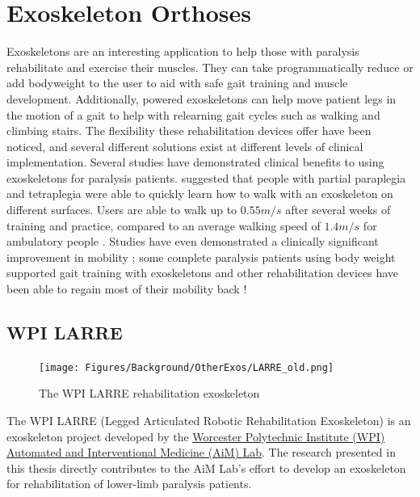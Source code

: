 \section{Exoskeleton Orthoses}
\label{sec:OtherExos}
Exoskeletons are an interesting application to help those with paralysis rehabilitate and exercise their muscles. They can take programmatically reduce or add bodyweight to the user to aid with safe gait training and muscle development. Additionally, powered exoskeletons can help move patient legs in the motion of a gait to help with relearning gait cycles such as walking and climbing stairs. The flexibility these rehabilitation devices offer have been noticed, and several different solutions exist at different levels of clinical implementation. Several studies have demonstrated clinical benefits to using exoskeletons for paralysis patients. \cite{ExoMobilityOutcome} suggested that people with partial paraplegia and tetraplegia were able to quickly learn how to walk with an exoskeleton on different surfaces. Users are able to walk up to \(0.55m/s\) after several weeks of training and practice, compared to an average walking speed of \(1.4m/s\) for ambulatory people \cite{IndigoClinicalStudy}. Studies have even demonstrated a clinically significant improvement in mobility \cite{GaitTrainingBenefitsRoboticsWalkbot} \cite{ImprovingGaitAdaptabilityInPatients} \cite{RoboticGaitTraining}; some complete paralysis patients using body weight supported gait training with exoskeletons and other rehabilitation devices have been able to regain most of their mobility back \cite{GaitTrainingClinical}!

\subsection{WPI LARRE}
\label{sec:larre}
\begin{figure}[ht!]
    \centering
    \texttt{[image: Figures/Background/OtherExos/LARRE\_old.png]}
    \caption{The WPI LARRE rehabilitation exoskeleton \cite{SpringWrapClutchKnee}}
    \label{fig:LARRE_Background}
\end{figure}

The WPI LARRE (Legged Articulated Robotic Rehabilitation Exoskeleton) is an exoskeleton project developed by the \href{http://aimlabdev.wpi.edu} {Worcester Polytechnic Institute (WPI) Automated and Interventional Medicine (AiM) Lab}. The research presented in this thesis directly contributes to the AiM Lab's effort to develop an exoskeleton for rehabilitation of lower-limb paralysis patients. 

